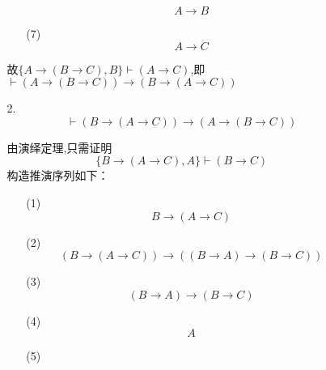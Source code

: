 \documentclass[11pt,oneside,a4paper]{article}
\begin{document}
\begin{itemize}
\begin{itemize}
\begin{itemize}
\begin{enumerate}
\begin{equation*}
                                        A \to B         \tag*{MP(4,5)}
                                \end{equation*}
                        \item[(7)]
                                \begin{equation*}
                                        A \to C         \tag*{MP(3,6)}
                                \end{equation*}                               
                    \end{enumerate}
                    故$\{A \to (B \to C),B\} \vdash (A \to C)$,即$\vdash (A \to (B \to C)) \to (B \to (A \to C))$
                
                \item[2.] \[ \vdash (B \to (A \to C)) \to (A \to (B \to C)) \] \par
                    由演绎定理,只需证明 
                                \[ \{B \to (A \to C),A\} \vdash (B \to C) \]
                    构造推演序列如下：
                    \begin{enumerate}
                        \item[(1)] 
                                \begin{equation*}
                                     B \to (A \to C)             \tag*{$\varGamma$}
                                \end{equation*}                    
                        \item[(2)] 
                                \begin{equation*}
                                    (B \to (A \to C)) \to ((B \to A) \to (B \to C)) \tag*{L2}
                                \end{equation*}
                        \item[(3)]
                                \begin{equation*}
                                   (B \to A) \to (B \to C)      \tag*{MP(1,2)}
                                \end{equation*}
                        \item[(4)]
                                \begin{equation*}
                                    A                           \tag*{$\varGamma$}
                                \end{equation*}
                        \item[(5)]

\end{enumerate}
\end{itemize}
\end{itemize}
\end{itemize}
\end{document}

